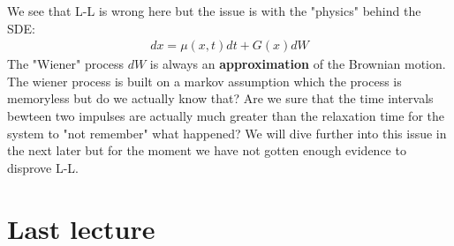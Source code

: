 \documentclass{report}
\begin{document}
We see that L-L is wrong here but the issue is with the "physics" behind the SDE:
\begin{align}
    d x=\mu\left(x, t\right) d t+G(x) d W
\end{align}
The "Wiener" process $dW$ is always an \textbf{approximation} of the Brownian motion. The wiener process is built on a markov assumption which the process is memoryless but do we actually know that? Are we sure that the time intervals bewteen two impulses are actually much greater than the relaxation time for the system to "not remember" what happened? We will dive further into this issue in the next later but for the moment we have not gotten enough evidence to disprove L-L.

\chapter{Last lecture}
\end{document}
